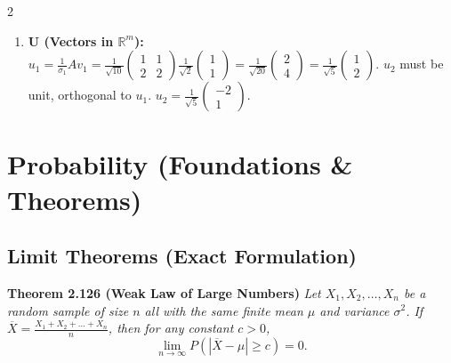 \documentclass[10pt, letterpaper]{article}
\begin{document}
\begin{multicols*}{2}
\begin{enumerate}
    $\lambda=0$: $\text{Nul}\begin{pmatrix} 5 & 5 \\ 5 & 5 \end{pmatrix} \implies v_2 = \frac{1}{\sqrt{2}}\begin{pmatrix} 1 \\ -1 \end{pmatrix}$.
    \item \textbf{U (Vectors in $\mathbb{R}^m$):}
    $u_1 = \frac{1}{\sigma_1} A v_1 = \frac{1}{\sqrt{10}} \begin{pmatrix} 1 & 1 \\ 2 & 2 \end{pmatrix} \frac{1}{\sqrt{2}}\begin{pmatrix} 1 \\ 1 \end{pmatrix} = \frac{1}{\sqrt{20}}\begin{pmatrix} 2 \\ 4 \end{pmatrix} = \frac{1}{\sqrt{5}}\begin{pmatrix} 1 \\ 2 \end{pmatrix}$.
    $u_2$ must be unit, orthogonal to $u_1$. $u_2 = \frac{1}{\sqrt{5}}\begin{pmatrix} -2 \\ 1 \end{pmatrix}$.
\end{enumerate}

\section{Probability (Foundations \& Theorems)}

\subsection{Limit Theorems (Exact Formulation)}

\noindent\textbf{Theorem 2.126 (Weak \colorbox{pink!30}{Law of Large Numbers})} \textit{Let $X_1, X_2, \dots, X_n$ be a random sample of size $n$ all with the same finite mean $\mu$ and variance $\sigma^2$. If $\overline{X} = \frac{X_1+X_2+\dots+X_n}{n}$, then for any constant $c > 0$,}
\[
\boxed{ \lim_{n\to\infty} P(|\overline{X} - \mu| \ge c) = 0. }
\]


\end{multicols*}
\end{document}
